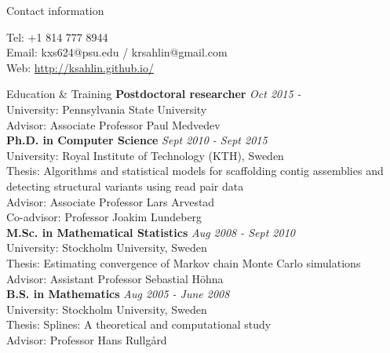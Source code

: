 \documentclass{resume} %
\begin{document}

\begin{rSection}{Contact information}

Tel: +1 814 777 8944\\
Email: kxs624@psu.edu / krsahlin@gmail.com\\
Web: \url{http://ksahlin.github.io/}
\end{rSection}


\begin{rSection}{Education \& Training}
{\bf Postdoctoral researcher} \hfill {\em Oct 2015 - } \\ 
University: Pennsylvania State University \\
Advisor: Associate Professor Paul Medvedev\\
{\bf Ph.D. in Computer Science} \hfill {\em Sept 2010 - Sept 2015} \\ 
University: Royal Institute of Technology (KTH), Sweden \\
Thesis: Algorithms and statistical models for scaffolding contig assemblies and detecting structural variants using read pair data \\
Advisor: Associate Professor Lars Arvestad\\
Co-advisor: Professor Joakim Lundeberg\\
{\bf M.Sc. in Mathematical Statistics} \hfill {\em Aug 2008 - Sept 2010} \\ 
University: Stockholm University, Sweden \\
Thesis: Estimating convergence of Markov chain 
Monte Carlo simulations\\
Advisor: Assistant Professor Sebastial H\"{o}hna\\
{\bf B.S. in Mathematics} \hfill {\em Aug 2005 - June 2008} \\ 
University: Stockholm University, Sweden \\
Thesis: Splines: A theoretical and computational study\\
Advisor: Professor Hans Rullg\r{a}rd\\
\end{rSection}
\end{document}
